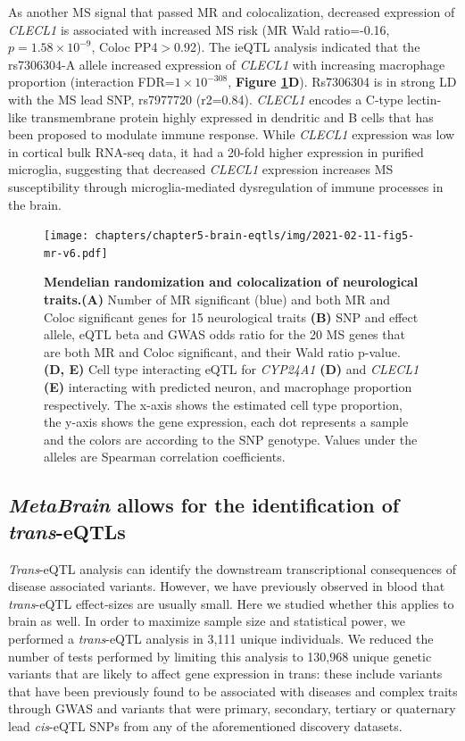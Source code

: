 As another MS signal that passed MR and colocalization, decreased expression of \textit{CLECL1} is associated with increased MS risk (MR Wald ratio=-0.16, $p=1.58 \times 10^{-9}$, Coloc PP4$>$0.92). The ieQTL analysis indicated that the rs7306304-A allele increased expression of \textit{CLECL1} with increasing macrophage proportion (interaction FDR=$1 \times 10^{-308}$, \textbf{Figure \ref{metabrain_fig5}D}). Rs7306304 is in strong LD with the MS lead SNP, rs7977720 (r2=0.84)\cite{consortiumMultipleSclerosisGenomic2019}. \textit{CLECL1} encodes a C-type lectin-like transmembrane protein highly expressed in dendritic and B cells that has been proposed to modulate immune response\cite{vanluijnMultipleSclerosisassociatedCLEC16A2015}. While \textit{CLECL1} expression was low in cortical bulk RNA-seq data, it had a 20-fold higher expression in purified microglia\cite{consortiumMultipleSclerosisGenomic2019}, suggesting that decreased \textit{CLECL1} expression increases MS susceptibility through microglia-mediated dysregulation of immune processes in the brain. 

\begin{figure}[H]
	\texttt{[image: chapters/chapter5-brain-eqtls/img/2021-02-11-fig5-mr-v6.pdf]}
	\caption{\textbf{Mendelian randomization and colocalization of neurological traits.}\textbf{(A)} Number of MR significant (blue) and both MR and Coloc significant genes for 15  neurological traits \textbf{(B)} SNP and effect allele, eQTL beta and GWAS odds ratio for the 20 MS genes that are both MR and Coloc significant, and their Wald ratio p-value. \textbf{(D, E)} Cell type interacting eQTL for \textit{CYP24A1} \textbf{(D)} and \textit{CLECL1} \textbf{(E)} interacting with predicted neuron, and macrophage proportion respectively. The x-axis shows the estimated cell type proportion, the y-axis shows the gene expression, each dot represents a sample and the colors are according to the SNP genotype. Values under the alleles are Spearman correlation coefficients.}
	\label{metabrain_fig5}
\end{figure}

\subsection{\textit{MetaBrain}  allows for the identification of \textit{trans}-eQTLs }
\textit{Trans}-eQTL analysis can identify the downstream transcriptional consequences of disease associated variants. However, we have previously observed in blood that \textit{trans}-eQTL effect-sizes are usually small. Here we studied whether this applies to brain as well. In order to maximize sample size and statistical power, we performed a \textit{trans}-eQTL analysis in 3,111 unique individuals. We reduced the number of tests performed by limiting this analysis to 130,968 unique genetic variants that are likely to affect gene expression in trans: these include variants that have been previously found to be associated with diseases and complex traits through GWAS and variants that were primary, secondary, tertiary or quaternary lead \textit{cis}-eQTL SNPs from any of the aforementioned discovery datasets.  

